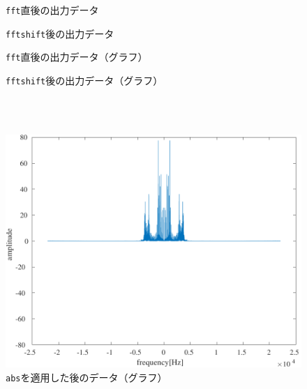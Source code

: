 \begin{figure}[h]
    \centering
    \begin{minipage}[b]{.48\textwidth}
        \centering
        
        \caption{\texttt{fft}直後の出力データ}
        \label{fig:fft直後のデータ}
    \end{minipage}
    \begin{minipage}[b]{.48\textwidth}
        \centering
        
        \caption{\texttt{fftshift}後の出力データ}
        \label{fig:fftshift後のデータ}
    \end{minipage}
    \begin{minipage}[b]{.48\textwidth}
        \centering
        
        \caption{\texttt{fft}直後の出力データ（グラフ）}
        \label{fig:fft直後のデータ（グラフ）}
    \end{minipage}
    \begin{minipage}[b]{.48\textwidth}
        \centering
        
        \caption{\texttt{fftshift}後の出力データ（グラフ）}
        \label{fig:fftshift後のデータ（グラフ）}
    \end{minipage}\\
    \dotfill\\
    \begin{minipage}[b]{.48\textwidth}
        \centering
        \includegraphics[keepaspectratio,width=.9\textwidth]{Figures/fft_abs.pdf}
        \caption{\texttt{abs}を適用した後のデータ（グラフ）}
        \label{fig:absを適用した後のデータ}
    \end{minipage}
    \begin{minipage}[b]{.48\textwidth}

\end{minipage}
\end{figure}

